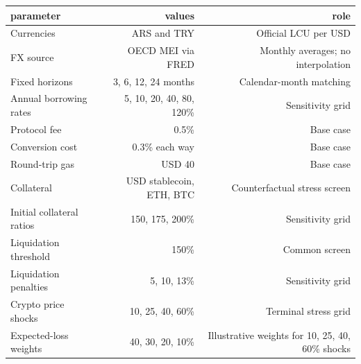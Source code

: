 \begin{tabular}{lrr}
\toprule
parameter & values & role \\
\midrule
Currencies & ARS and TRY & Official LCU per USD \\
FX source & OECD MEI via FRED & Monthly averages; no interpolation \\
Fixed horizons & 3, 6, 12, 24 months & Calendar-month matching \\
Annual borrowing rates & 5, 10, 20, 40, 80, 120\% & Sensitivity grid \\
Protocol fee & 0.5\% & Base case \\
Conversion cost & 0.3\% each way & Base case \\
Round-trip gas & USD 40 & Base case \\
Collateral & USD stablecoin, ETH, BTC & Counterfactual stress screen \\
Initial collateral ratios & 150, 175, 200\% & Sensitivity grid \\
Liquidation threshold & 150\% & Common screen \\
Liquidation penalties & 5, 10, 13\% & Sensitivity grid \\
Crypto price shocks & 10, 25, 40, 60\% & Terminal stress grid \\
Expected-loss weights & 40, 30, 20, 10\% & Illustrative weights for 10, 25, 40, 60\% shocks \\
\bottomrule
\end{tabular}
